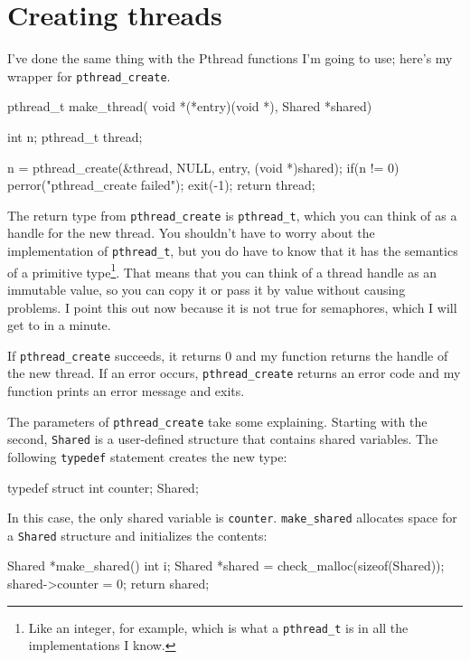 \documentclass{book}
\begin{document}
\section{Creating threads}

I've done the same thing with the Pthread functions I'm going to use;
here's my wrapper for {\tt pthread\_create}.

\begin{unbreakable}[]{}
pthread_t make_thread(
    void *(*entry)(void *), 
    Shared *shared) 
{
  int n;
  pthread_t thread;

  n = pthread_create(&thread, NULL, entry, 
    (void *)shared);
  if(n != 0) {
    perror("pthread_create failed");
    exit(-1);
  }
  return thread;
}
\end{unbreakable}

The return type from {\tt pthread\_create} is {\tt pthread\_t},
which you can think of as a handle for the new thread.  You
shouldn't have to worry about the implementation of {\tt pthread\_t},
but you do have to know that it has the semantics of a primitive
type\footnote{Like an integer, for example, which is what a
        {\tt pthread\_t} is in all the implementations I know.}.  That
means that you can think of a thread handle as an immutable
value, so you can copy it or pass it by value without causing
problems.  I point this out now because it is not true for
semaphores, which I will get to in a minute.

If {\tt pthread\_create} succeeds, it returns 0 and my function
returns the handle of the new thread.
If an error occurs, {\tt pthread\_create}
returns an error code and my function prints an error message
and exits.

The parameters of {\tt pthread\_create} take some
explaining.  Starting with the second,
{\tt Shared}
is a user-defined structure that contains shared variables.
The following {\tt typedef} statement creates the new type:

\begin{unbreakable}[title={}]{}
typedef struct {
  int counter;
} Shared;
\end{unbreakable}

In this case, the only shared variable is {\tt counter}.
{\tt make\_shared} allocates
space for a {\tt Shared} structure and initializes the contents:

\begin{unbreakable}[title={}]{}
Shared *make_shared() {
  int i;
  Shared *shared = 
    check_malloc(sizeof(Shared));
  shared->counter = 0;
  return shared;
}
\end{unbreakable}
\end{document}
